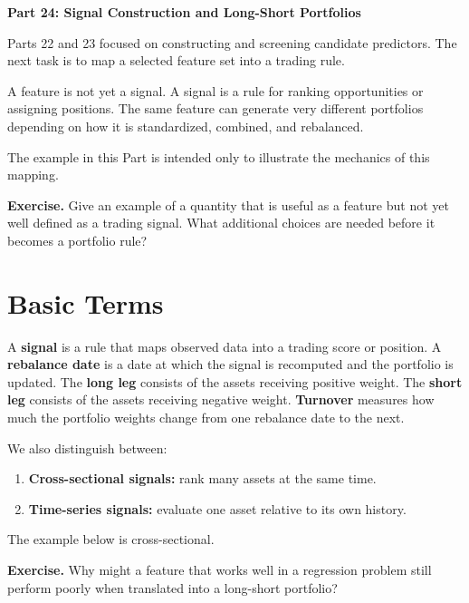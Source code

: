 \documentclass[11pt]{article}
\newcommand{\answerlines}[1]{\vspace{#1\baselineskip}}
\begin{document}
\begin{center}
{\Large \textbf{Part 24: Signal Construction and Long-Short Portfolios}}
\end{center}

Parts 22 and 23 focused on constructing and screening candidate predictors. The
next task is to map a selected feature set into a trading rule.

A feature is not yet a signal. A signal is a rule for ranking opportunities or
assigning positions. The same feature can generate very different portfolios
depending on how it is standardized, combined, and rebalanced.

The example in this Part is intended only to illustrate the mechanics of this
mapping.

\textbf{Exercise.} Give an example of a quantity that is useful as a feature
but not yet well defined as a trading signal. What additional choices are
needed before it becomes a portfolio rule?

\answerlines{6}

\newpage

\section*{Basic Terms}

A \textbf{signal} is a rule that maps observed data into a trading score or
position. A \textbf{rebalance date} is a date at which the signal is recomputed
and the portfolio is updated. The \textbf{long leg} consists of the assets
receiving positive weight. The \textbf{short leg} consists of the assets
receiving negative weight. \textbf{Turnover} measures how much the portfolio
weights change from one rebalance date to the next.

We also distinguish between:

\begin{enumerate}
  \item \textbf{Cross-sectional signals:} rank many assets at the same time.
  \item \textbf{Time-series signals:} evaluate one asset relative to its own history.
\end{enumerate}

The example below is cross-sectional.

\textbf{Exercise.} Why might a feature that works well in a regression problem
still perform poorly when translated into a long-short portfolio?

\answerlines{6}
\end{document}

